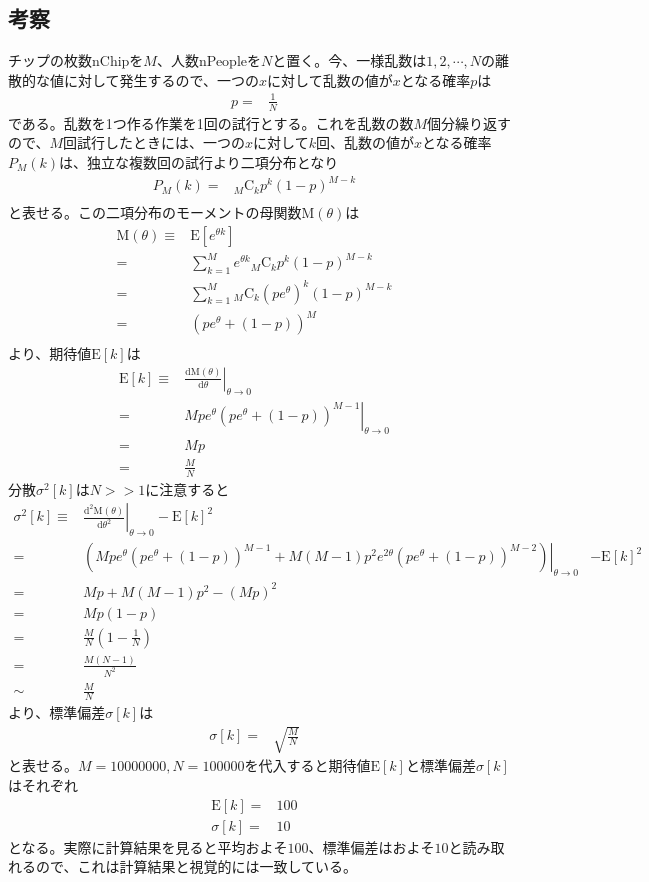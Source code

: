 \documentclass[ %
  platex,%
  papersize,%
  twocolumn,
  landscape
]{jsarticle}
\begin{document}
\subsection{考察}
チップの枚数nChipを$M$、人数nPeopleを$N$と置く。今、一様乱数は$1,2,\cdots,N$の離散的な値に対して発生するので、一つの$x$に対して乱数の値が$x$となる確率$p$は
\begin{align}
  p=&\frac{1}{N}&
\end{align}
である。乱数を1つ作る作業を1回の試行とする。これを乱数の数$M$個分繰り返すので、$M$回試行したときには、一つの$x$に対して$k$回、乱数の値が$x$となる確率$P_M(k)$は、独立な複数回の試行より二項分布となり
\begin{align}
  P_M(k)=&{}_M \mathrm{C}_k p^k (1-p)^{M-k}&\\
\end{align}
と表せる。この二項分布のモーメントの母関数$\textrm{M}(\theta)$は
\begin{align}
  \textrm{M}(\theta)\equiv&\textrm{E}[e^{\theta k}]&\\
  =&\sum_{k=1}^{M}e^{\theta k}{}_M \mathrm{C}_k p^k (1-p)^{M-k}&\\
  =&\sum_{k=1}^{M}{}_M \mathrm{C}_k \left(pe^{\theta}\right)^k (1-p)^{M-k}&\\
  =&\left(pe^{\theta}+(1-p)\right)^M&\\
\end{align}
より、期待値$\textrm{E}[k]$は
\begin{align}
  \textrm{E}[k]\equiv&\left.\frac{\textrm{d}\textrm{M}(\theta)}{\textrm{d}\theta}\right|_{\theta\rightarrow0}&\\
  =&\left.Mpe^{\theta}\left(pe^{\theta}+(1-p)\right)^{M-1}\right|_{\theta\rightarrow0}&\\
  =&Mp&\\
  =&\frac{M}{N}&
\end{align}
分散$\sigma^{2}[k]$は$N>>1$に注意すると
\begin{align}
  \sigma^{2}[k]\equiv&\left.\frac{\textrm{d}^{2}\textrm{M}(\theta)}{\textrm{d}\theta^2}\right|_{\theta\rightarrow0}-\textrm{E}[k]^2&\\
  =&\left.\left(Mpe^{\theta}\left(pe^{\theta}+(1-p)\right)^{M-1}+M(M-1)p^{2}e^{2\theta}\left(pe^{\theta}+(1-p)\right)^{M-2}\right)\right|_{\theta\rightarrow0}&-\textrm{E}[k]^2\\
  =&Mp+M(M-1)p^{2}-(Mp)^2&\\
  =&Mp(1-p)&\\
  =&\frac{M}{N}\left(1-\frac{1}{N}\right)&\\
  =&\frac{M(N-1)}{N^2}&\\
  \sim&\frac{M}{N}&
\end{align}
より、標準偏差$\sigma[k]$は
\begin{align}
  \sigma[k]=&\sqrt{\frac{M}{N}}&
\end{align}
と表せる。$M=10000000, N=100000$を代入すると期待値$\textrm{E}[k]$と標準偏差$\sigma[k]$はそれぞれ
\begin{align}
  \textrm{E}[k]=&100&\\
  \sigma[k]=&10&
\end{align}
となる。実際に計算結果を見ると平均およそ$100$、標準偏差はおよそ$10$と読み取れるので、これは計算結果と視覚的には一致している。
\end{document}
